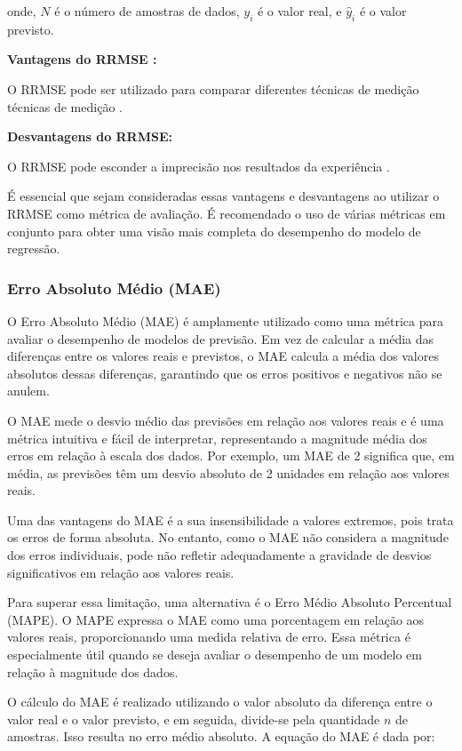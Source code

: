\noindent onde, $N$ é o número de amostras de dados, $y_i$ é o valor real, e $\hat{y}_i$ é o valor previsto.

\noindent\textbf{Vantagens do RRMSE :}


 O RRMSE pode ser utilizado para comparar diferentes técnicas de medição
 técnicas de medição \cite{jadon2022comprehensive}.


\noindent\textbf{Desvantagens do RRMSE:}


O RRMSE pode esconder a imprecisão nos resultados da experiência \cite{jadon2022comprehensive}.


É essencial que sejam consideradas essas vantagens e desvantagens ao utilizar o RRMSE como métrica de avaliação. É recomendado o uso de várias métricas em conjunto para obter uma visão mais completa do desempenho do modelo de regressão.



\subsubsection{Erro Absoluto M\'edio (MAE)}

O Erro Absoluto Médio (MAE) é amplamente utilizado como uma métrica para avaliar o desempenho de modelos de previsão. Em vez de calcular a média das diferenças entre os valores reais e previstos, o MAE calcula a média dos valores absolutos dessas diferenças, garantindo que os erros positivos e negativos não se anulem.

O MAE mede o desvio médio das previsões em relação aos valores reais e é uma métrica intuitiva e fácil de interpretar, representando a magnitude média dos erros em relação à escala dos dados. Por exemplo, um MAE de 2 significa que, em média, as previsões têm um desvio absoluto de 2 unidades em relação aos valores reais.

Uma das vantagens do MAE é a sua insensibilidade a valores extremos, pois trata os erros de forma absoluta. No entanto, como o MAE não considera a magnitude dos erros individuais, pode não refletir adequadamente a gravidade de desvios significativos em relação aos valores reais.

Para superar essa limitação, uma alternativa é o Erro Médio Absoluto Percentual (MAPE). O MAPE expressa o MAE como uma porcentagem em relação aos valores reais, proporcionando uma medida relativa de erro. Essa métrica é especialmente útil quando se deseja avaliar o desempenho de um modelo em relação à magnitude dos dados.


O cálculo do MAE é realizado utilizando o valor absoluto da diferença entre o valor real e o valor previsto, e em seguida, divide-se pela quantidade $n$ de amostras. Isso resulta no erro médio absoluto. A equação do MAE é dada por:

